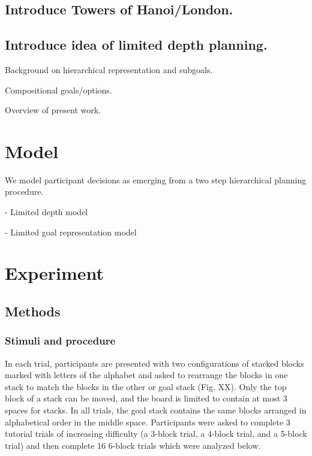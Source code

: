 \documentclass[10pt,letterpaper]{article}
\begin{document}
\subsection{Introduce Towers of Hanoi/London.}

\subsection{Introduce idea of limited depth planning.}

Background on hierarchical representation and subgoals.

Compositional goals/options.

Overview of present work.


\section{Model}
We model participant decisions as emerging from a two step hierarchical planning procedure. 

- Limited depth model

- Limited goal representation model



\section{Experiment}

\subsection{Methods}
\subsubsection{Stimuli and procedure}

In each trial, participants are presented with two configurations of stacked blocks marked with letters of the alphabet and asked to rearrange the blocks in one stack to match the blocks in the other or goal stack (Fig. XX). Only the top block of a stack can be moved, and the board is limited to contain at most 3 spaces for stacks. In all trials, the goal stack contains the same blocks arranged in alphabetical order in the middle space. Participants were asked to complete 3 tutorial trials of increasing difficulty (a 3-block trial, a 4-block trial, and a 5-block trial) and then complete 16 6-block trials which were analyzed below.
\end{document}
